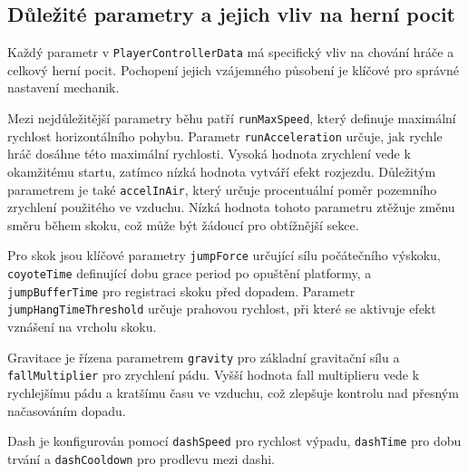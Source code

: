 \subsection{Důležité parametry a jejich vliv na herní pocit}

Každý parametr v \texttt{PlayerControllerData} má specifický vliv na chování hráče a celkový herní pocit. Pochopení jejich vzájemného působení je klíčové pro správné nastavení mechanik.

Mezi nejdůležitější parametry běhu patří \texttt{runMaxSpeed}, který definuje maximální rychlost horizontálního pohybu. Parametr \texttt{runAcceleration} určuje, jak rychle hráč dosáhne této maximální rychlosti. Vysoká hodnota zrychlení vede k okamžitému startu, zatímco nízká hodnota vytváří efekt rozjezdu. Důležitým parametrem je také \texttt{accelInAir}, který určuje procentuální poměr pozemního zrychlení použitého ve vzduchu. Nízká hodnota tohoto parametru ztěžuje změnu směru během skoku, což může být žádoucí pro obtížnější sekce.

Pro skok jsou klíčové parametry \texttt{jumpForce} určující sílu počátečního výskoku, \texttt{coyoteTime} definující dobu grace period po opuštění platformy, a \texttt{jumpBufferTime} pro registraci skoku před dopadem. Parametr \texttt{jumpHangTimeThreshold} určuje prahovou rychlost, při které se aktivuje efekt vznášení na vrcholu skoku.

Gravitace je řízena parametrem \texttt{gravity} pro základní gravitační sílu a \texttt{fallMultiplier} pro zrychlení pádu. Vyšší hodnota fall multiplieru vede k rychlejšímu pádu a kratšímu času ve vzduchu, což zlepšuje kontrolu nad přesným načasováním dopadu.

Dash je konfigurován pomocí \texttt{dashSpeed} pro rychlost výpadu, \texttt{dashTime} pro dobu trvání a \texttt{dashCooldown} pro prodlevu mezi dashi.